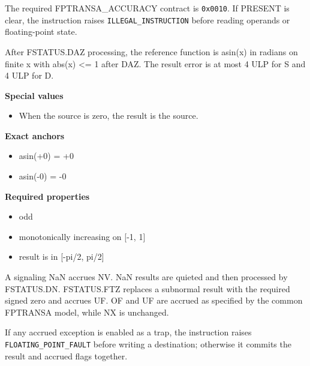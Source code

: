 The required FPTRANSA\_ACCURACY contract is \texttt{0x0010}. If PRESENT is clear, the instruction raises \texttt{ILLEGAL\_INSTRUCTION} before reading operands or floating-point state.

After FSTATUS.DAZ processing, the reference function is asin(x) in radians on finite x with abs(x) \textless{}= 1 after DAZ. The result error is at most 4 ULP for S and 4 ULP for D.

\textbf{Special values}\par
\begin{itemize}
\item When the source is zero, the result is the source.
\end{itemize}

\textbf{Exact anchors}\par
\begin{itemize}
\item asin(+0) = +0
\item asin(-0) = -0
\end{itemize}

\textbf{Required properties}\par
\begin{itemize}
\item odd
\item monotonically increasing on [-1, 1]
\item result is in [-pi/2, pi/2]
\end{itemize}

A signaling NaN accrues NV. NaN results are quieted and then processed by FSTATUS.DN. FSTATUS.FTZ replaces a subnormal result with the required signed zero and accrues UF. OF and UF are accrued as specified by the common FPTRANSA model, while NX is unchanged.

If any accrued exception is enabled as a trap, the instruction raises \texttt{FLOATING\_POINT\_FAULT} before writing a destination; otherwise it commits the result and accrued flags together.
